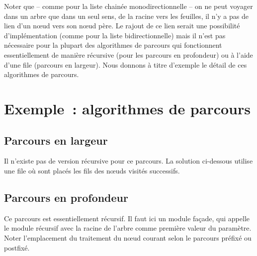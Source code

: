 	Noter que -- comme pour la liste chainée monodirectionnelle -- 
	on ne peut voyager dans un arbre que dans un seul sens,
	de la racine vers les feuilles, il n'y a pas de lien 
	d'un n{\oe}ud vers son n{\oe}ud père. Le rajout de ce lien serait
	une possibilité d'implémentation (comme pour la liste bidirectionnelle) 
	mais il n'est pas nécessaire pour la plupart des algorithmes 
	de parcours qui fonctionnent essentiellement de manière récursive 
	(pour les parcours en profondeur) ou à l'aide d'une file 
	(parcours en largeur). Nous donnons à titre d'exemple le détail 
	de ces algorithmes de parcours.

\section{Exemple~: algorithmes de parcours}

	\subsection{Parcours en largeur}
		
		Il n'existe pas de version récursive pour ce parcours. 
		La solution ci-dessous utilise une file où sont placés les fils
		des n{\oe}uds visités successifs.
		

	\subsection{Parcours en profondeur}

		Ce parcours est essentiellement récursif. Il faut ici un module 
		façade, qui appelle le module récursif avec la racine de
		l'arbre comme première valeur du paramètre. Noter l'emplacement 
		du traitement du n{\oe}ud courant selon le parcours
		préfixé ou postfixé.
		
